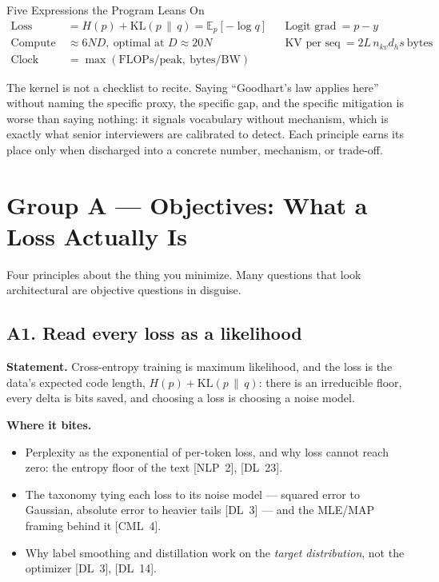 \begin{mathresult}{Five Expressions the Program Leans On}
\begin{align*}
\text{Loss} \ &= H(p) + \mathrm{KL}(p \,\|\, q) = \mathbb{E}_{p}[-\log q]
&& \text{Logit grad} \ = p - y \\
\text{Compute} \ &\approx 6ND, \ \text{optimal at } D \approx 20N
&& \text{KV per seq} \ = 2 L\, n_{kv} d_h s \ \text{bytes} \\
\text{Clock} \ &= \max(\text{FLOPs}/\text{peak}, \ \text{bytes}/\text{BW})
\end{align*}
\end{mathresult}

\begin{warningbox}
The kernel is not a checklist to recite. Saying ``Goodhart's law applies here'' without naming the specific proxy, the specific gap, and the specific mitigation is worse than saying nothing: it signals vocabulary without mechanism, which is exactly what senior interviewers are calibrated to detect. Each principle earns its place only when discharged into a concrete number, mechanism, or trade-off.
\end{warningbox}

\section*{Group A --- Objectives: What a Loss Actually Is}

Four principles about the thing you minimize. Many questions that look architectural are objective questions in disguise.

\subsection*{A1. Read every loss as a likelihood}

\textbf{Statement.} Cross-entropy training is maximum likelihood, and the loss is the data's expected code length, $H(p) + \mathrm{KL}(p\,\|\,q)$: there is an irreducible floor, every delta is bits saved, and choosing a loss is choosing a noise model.

\textbf{Where it bites.}
\begin{itemize}[itemsep=1pt,topsep=2pt,leftmargin=1.3em]
\item Perplexity as the exponential of per-token loss, and why loss cannot reach zero: the entropy floor of the text [NLP~2], [DL~23].
\item The taxonomy tying each loss to its noise model --- squared error to Gaussian, absolute error to heavier tails [DL~3] --- and the MLE/MAP framing behind it [CML~4].
\item Why label smoothing and distillation work on the \emph{target distribution}, not the optimizer [DL~3], [DL~14].
\end{itemize}

